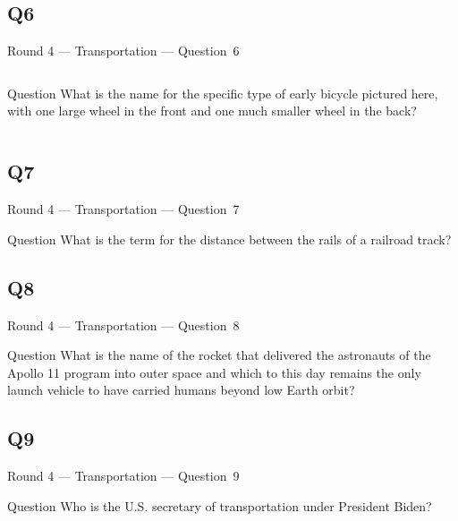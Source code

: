\documentclass[11pt]{beamer}
\begin{document}
\subsection*{Q6}
\begin{frame}[t]{Round 4 --- Transportation --- \mbox{Question 6}}
\vspace{-0.5em}
\begin{columns}[T,totalwidth=\linewidth]
\begin{column}{0.32\linewidth}
\begin{block}{Question}
What is the name for the specific type of early bicycle pictured here, with one large wheel in the front and one much smaller wheel in the back?
\end{block}
\end{column}
\begin{column}{0.65\linewidth}
\begin{center}
\texttt{[image: \{Images/pennyfarthing]}.jpg}
\end{center}
\end{column}
\end{columns}
\end{frame}
\subsection*{Q7}
\begin{frame}[t]{Round 4 --- Transportation --- \mbox{Question 7}}
\vspace{-0.5em}
\begin{block}{Question}
What is the term for the distance between the rails of a railroad track?
\end{block}
\end{frame}
\subsection*{Q8}
\begin{frame}[t]{Round 4 --- Transportation --- \mbox{Question 8}}
\vspace{-0.5em}
\begin{block}{Question}
What is the name of the rocket that delivered the astronauts of the Apollo 11 program into outer space and which to this day remains the only launch vehicle to have carried humans beyond low Earth orbit?
\end{block}
\end{frame}
\subsection*{Q9}
\begin{frame}[t]{Round 4 --- Transportation --- \mbox{Question 9}}
\vspace{-0.5em}
\begin{block}{Question}
Who is the U.S. secretary of transportation under President Biden?
\end{block}
\end{frame}
\end{document}
